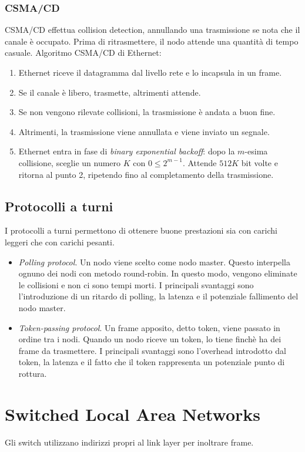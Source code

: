 \documentclass[11pt]{book}
\begin{document}
\subsubsection{CSMA/CD}
CSMA/CD effettua collision detection, annullando una trasmissione se nota che il canale è occupato. Prima di ritrasmettere, 
il nodo attende una quantità di tempo casuale. Algoritmo CSMA/CD di Ethernet:
\begin{enumerate}
    \item Ethernet riceve il datagramma dal livello rete e lo incapsula in un frame.
    \item Se il canale è libero, trasmette, altrimenti attende.
    \item Se non vengono rilevate collisioni, la trasmissione è andata a buon fine.
    \item Altrimenti, la trasmissione viene annullata e viene inviato un segnale.
    \item Ethernet entra in fase di \textit{binary exponential backoff}: dopo la $m$-esima collisione, sceglie un numero 
    $K$ con $0\leq 2^{m-1}$. Attende $512K$ bit volte e ritorna al punto 2, ripetendo fino al completamento della trasmissione.
\end{enumerate}
\subsection{Protocolli a turni}
I protocolli a turni permettono di ottenere buone prestazioni sia con carichi leggeri che con carichi pesanti. 
\begin{itemize}
    \item \textit{Polling protocol}. Un nodo viene scelto come nodo master. Questo interpella ognuno dei nodi con metodo 
    round-robin. In questo modo, vengono eliminate le collisioni e non ci sono tempi morti. I principali svantaggi sono 
    l'introduzione di un ritardo di polling, la latenza e il potenziale fallimento del nodo master.
    \item \textit{Token-passing protocol}. Un frame apposito, detto token, viene passato in ordine tra i nodi. Quando un 
    nodo riceve un token, lo tiene finchè ha dei frame da trasmettere. I principali svantaggi sono l'overhead introdotto 
    dal token, la latenza e il fatto che il token rappresenta un potenziale punto di rottura.
\end{itemize}
\section{Switched Local Area Networks}
Gli switch utilizzano indirizzi propri al link layer per inoltrare frame.
\end{document}
